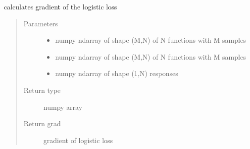 \documentclass[letterpaper,10pt,english]{sphinxmanual}
\begin{document}
\begin{fulllineitems}
\label{\detokenize{regression:regression.logit_gradient}}
calculates gradient of the logistic loss
\begin{quote}\begin{description}
\item[{Parameters}] \leavevmode\begin{itemize}
\item {} 
 \textendash{} numpy ndarray of shape (M,N) of N functions with M samples

\item {} 
 \textendash{} numpy ndarray of shape (M,N) of N functions with M samples

\item {} 
 \textendash{} numpy ndarray of shape (1,N) responses

\end{itemize}

\item[{Return type}] \leavevmode
numpy array

\item[{Return grad}] \leavevmode
gradient of logistic loss

\end{description}\end{quote}

\end{fulllineitems}

\end{document}
